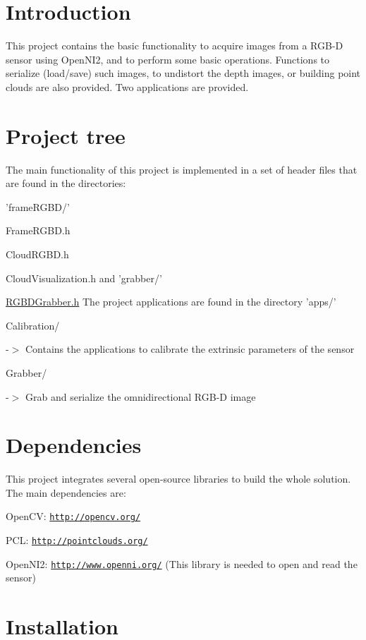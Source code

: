 \hypertarget{index_intro_sec}{}\section{Introduction}\label{index_intro_sec}
This project contains the basic functionality to acquire images from a R\-G\-B-\/\-D sensor using Open\-N\-I2, and to perform some basic operations. Functions to serialize (load/save) such images, to undistort the depth images, or building point clouds are also provided. Two applications are provided.\hypertarget{index_project_sec}{}\section{Project tree}\label{index_project_sec}
The main functionality of this project is implemented in a set of header files that are found in the directories\-: \par
 'frame\-R\-G\-B\-D/'
\begin{DoxyItemize}
\item Frame\-R\-G\-B\-D.\-h
\item Cloud\-R\-G\-B\-D.\-h
\item Cloud\-Visualization.\-h and 'grabber/'
\item \hyperlink{RGBDGrabber_8h_source}{R\-G\-B\-D\-Grabber.\-h} The project applications are found in the directory 'apps/'
\item Calibration/ \par
 -\/$>$ Contains the applications to calibrate the extrinsic parameters of the sensor
\item Grabber/ \par
 -\/$>$ Grab and serialize the omnidirectional R\-G\-B-\/\-D image
\end{DoxyItemize}\hypertarget{index_dependencies_sec}{}\section{Dependencies}\label{index_dependencies_sec}
This project integrates several open-\/source libraries to build the whole solution. The main dependencies are\-:
\begin{DoxyItemize}
\item Open\-C\-V\-: \href{http://opencv.org/}{\tt http\-://opencv.\-org/}
\item P\-C\-L\-: \href{http://pointclouds.org/}{\tt http\-://pointclouds.\-org/}
\item Open\-N\-I2\-: \href{http://www.openni.org/}{\tt http\-://www.\-openni.\-org/} (This library is needed to open and read the sensor)
\end{DoxyItemize}\hypertarget{index_install_sec}{}\section{Installation}\label{index_install_sec}
